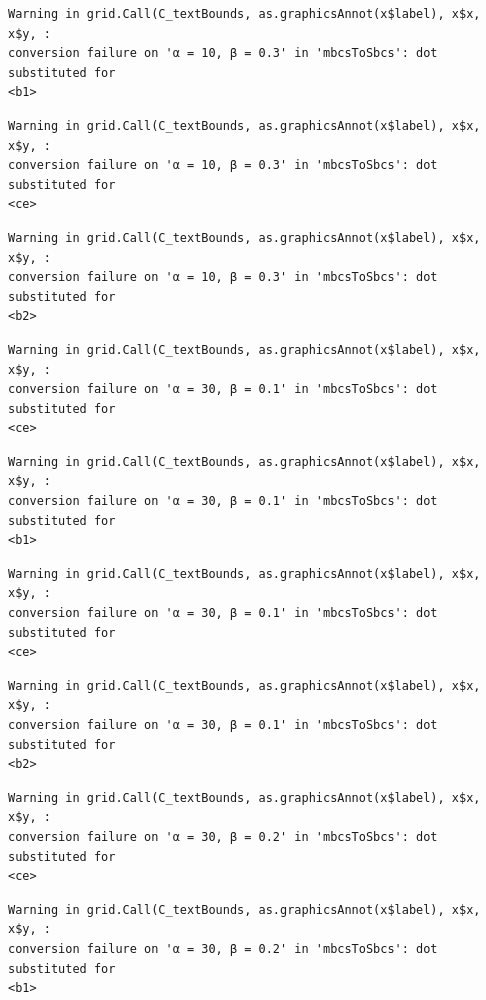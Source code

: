 \documentclass[
  spanish,
  a4paper,
]{scrreport}
\theoremstyle{plain}
\theoremstyle{definition}
\theoremstyle{definition}
\theoremstyle{remark}
\begin{document}
\begin{verbatim}
Warning in grid.Call(C_textBounds, as.graphicsAnnot(x$label), x$x, x$y, :
conversion failure on 'α = 10, β = 0.3' in 'mbcsToSbcs': dot substituted for
<b1>
\end{verbatim}

\begin{verbatim}
Warning in grid.Call(C_textBounds, as.graphicsAnnot(x$label), x$x, x$y, :
conversion failure on 'α = 10, β = 0.3' in 'mbcsToSbcs': dot substituted for
<ce>
\end{verbatim}

\begin{verbatim}
Warning in grid.Call(C_textBounds, as.graphicsAnnot(x$label), x$x, x$y, :
conversion failure on 'α = 10, β = 0.3' in 'mbcsToSbcs': dot substituted for
<b2>
\end{verbatim}

\begin{verbatim}
Warning in grid.Call(C_textBounds, as.graphicsAnnot(x$label), x$x, x$y, :
conversion failure on 'α = 30, β = 0.1' in 'mbcsToSbcs': dot substituted for
<ce>
\end{verbatim}

\begin{verbatim}
Warning in grid.Call(C_textBounds, as.graphicsAnnot(x$label), x$x, x$y, :
conversion failure on 'α = 30, β = 0.1' in 'mbcsToSbcs': dot substituted for
<b1>
\end{verbatim}

\begin{verbatim}
Warning in grid.Call(C_textBounds, as.graphicsAnnot(x$label), x$x, x$y, :
conversion failure on 'α = 30, β = 0.1' in 'mbcsToSbcs': dot substituted for
<ce>
\end{verbatim}

\begin{verbatim}
Warning in grid.Call(C_textBounds, as.graphicsAnnot(x$label), x$x, x$y, :
conversion failure on 'α = 30, β = 0.1' in 'mbcsToSbcs': dot substituted for
<b2>
\end{verbatim}

\begin{verbatim}
Warning in grid.Call(C_textBounds, as.graphicsAnnot(x$label), x$x, x$y, :
conversion failure on 'α = 30, β = 0.2' in 'mbcsToSbcs': dot substituted for
<ce>
\end{verbatim}

\begin{verbatim}
Warning in grid.Call(C_textBounds, as.graphicsAnnot(x$label), x$x, x$y, :
conversion failure on 'α = 30, β = 0.2' in 'mbcsToSbcs': dot substituted for
<b1>
\end{verbatim}
\end{document}
